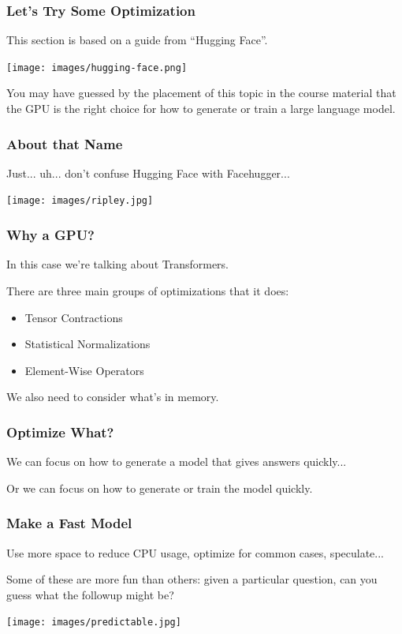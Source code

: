 \begin{frame}
\frametitle{Let's Try Some Optimization}

This section is based on a guide from ``Hugging Face''. 

\begin{center}
	\texttt{[image: images/hugging-face.png]}
\end{center}

You may have guessed by the placement of this topic in the course material that the GPU is the right choice for how to generate or train a large language model. 

\end{frame}

\begin{frame}
\frametitle{About that Name}

Just... uh... don't confuse Hugging Face with Facehugger...

\begin{center}
	\texttt{[image: images/ripley.jpg]}
\end{center}

\end{frame}

\begin{frame}
\frametitle{Why a GPU?}

In this case we're talking about Transformers.

There are three main groups of optimizations that it does:\\
\begin{itemize} 
	\item Tensor Contractions
	\item Statistical Normalizations
	\item Element-Wise Operators
\end{itemize}

We also need to consider what's in memory.

\end{frame}

\begin{frame}
\frametitle{Optimize What?}

We can focus on how to generate a model that gives answers quickly...

Or we can focus on how to generate or train the model quickly.

\end{frame}

\begin{frame}
\frametitle{Make a Fast Model}

Use more space to reduce CPU usage, optimize for common cases, speculate...

Some of these are more fun than others: given a particular question, can you guess what the followup might be? 

\begin{center}
	\texttt{[image: images/predictable.jpg]}
\end{center}

\end{frame}

